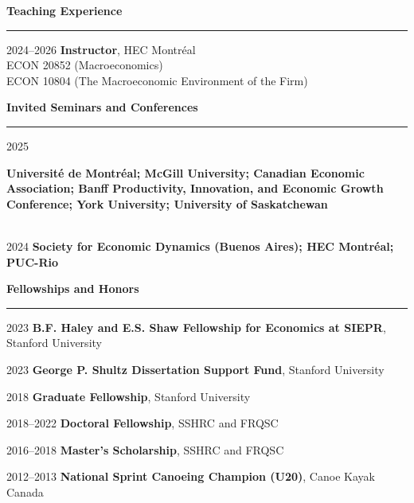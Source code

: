 \documentclass[12pt]{article}
\begin{document}
{\large \textbf{Teaching Experience}} \\
\noindent\rule[0.5\baselineskip]{\textwidth}{1pt}

\begin{small}
2024--2026 \tabto{3cm} \textbf{Instructor}, HEC Montr\'eal \\
\tabto{3cm} \hspace{0.25cm} ECON 20852 (Macroeconomics) \\
\tabto{3cm} \hspace{0.25cm} ECON 10804 (The Macroeconomic Environment of the Firm)
\end{small}

\vspace{0.5cm}

{\large \textbf{Invited Seminars and Conferences}} \\
\noindent\rule[0.5\baselineskip]{\textwidth}{1pt}

\begin{small}

2025 \tabto{3cm} \parbox[t]{13cm}{\textbf{Université de Montréal; McGill University; Canadian Economic Association; Banff Productivity, Innovation, and Economic Growth Conference; York University; University of Saskatchewan}} \\

2024 \tabto{3cm} \textbf{Society for Economic
Dynamics (Buenos Aires); HEC Montr\'eal; PUC-Rio}

\end{small}

\vspace{0.5cm}

{\large \textbf{Fellowships and Honors}} \\
\noindent\rule[0.5\baselineskip]{\textwidth}{1pt}

\begin{small}

2023 \tabto{3cm} \textbf{B.F. Haley and E.S. Shaw Fellowship for Economics at SIEPR}, Stanford University

2023 \tabto{3cm} \textbf{George P. Shultz Dissertation Support Fund}, Stanford University

2018 \tabto{3cm} \textbf{Graduate Fellowship}, Stanford University

2018--2022 \tabto{3cm} \textbf{Doctoral Fellowship}, SSHRC and FRQSC

2016--2018 \tabto{3cm} \textbf{Master's Scholarship}, SSHRC and FRQSC

2012--2013 \tabto{3cm} \textbf{National Sprint Canoeing Champion (U20)}, Canoe Kayak Canada
\end{small}
\end{document}
